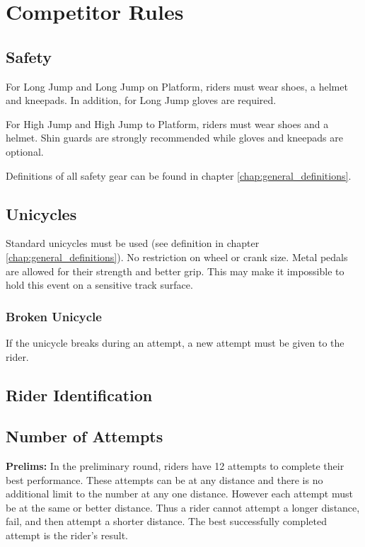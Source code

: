 \chapter{Competitor Rules}

\section{Safety}

For Long Jump and Long Jump on Platform, riders must wear shoes, a helmet and kneepads.
In addition, for Long Jump gloves are required.

For High Jump and High Jump to Platform, riders must wear shoes and a helmet.
Shin guards are strongly recommended while gloves and kneepads are optional.

Definitions of all safety gear can be found in chapter \ref{chap:general_definitions}.

\section{Unicycles}


Standard unicycles must be used (see definition in chapter \ref{chap:general_definitions}).
No restriction on wheel or crank size.
Metal pedals are allowed for their strength and better grip.
This may make it impossible to hold this event on a sensitive track surface.

\subsection{Broken Unicycle}
If the unicycle breaks during an attempt, a new attempt must be given to the rider.

\section{Rider Identification}

\section{Number of Attempts}

\textbf{Prelims:}
In the preliminary round, riders have 12 attempts to complete their best performance.
These attempts can be at any distance and there is no additional limit to the number at any one distance.
However each attempt must be at the same or better distance.
Thus a rider cannot attempt a longer distance, fail, and then attempt a shorter distance.
The best successfully completed attempt is the rider's result.


